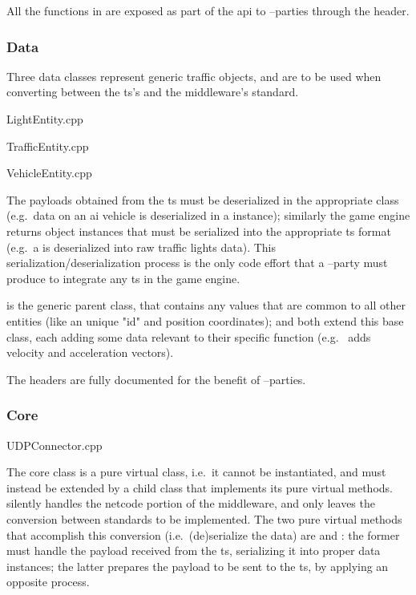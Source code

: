 All the functions in  are exposed as part of the \gls{api} to --parties through the  header.

\subsubsection{Data}

Three data classes represent generic traffic objects, and are to be used when converting between the \gls{ts}'s and the \gls{middleware}'s standard.

\begin{filelist}
	\item LightEntity.cpp
	\item TrafficEntity.cpp
	\item VehicleEntity.cpp
\end{filelist}

The \glspl{payload} obtained from the \gls{ts} must be deserialized in the appropriate class (e.g.\ data on an \gls{ai} vehicle is deserialized in a  instance); similarly the game engine returns object instances that must be serialized into the appropriate \gls{ts} format (e.g.\ a  is deserialized into raw traffic lights data). This serialization/deserialization process is the only code effort that a --party must produce to integrate any \gls{ts} in the game engine.

 is the generic parent class, that contains any values that are common to all other entities (like an unique "id" and position coordinates);  and  both extend this base class, each adding some data relevant to their specific function (e.g.\  adds velocity and acceleration vectors).

The headers are fully documented for the  benefit of --parties.

\subsubsection{Core}

\begin{filelist}
	\item UDPConnector.cpp
\end{filelist}

The core class is a  pure virtual class, i.e.\ it cannot be instantiated, and must instead be extended by a child class that implements its pure virtual methods.  silently handles the netcode portion of the \gls{middleware}, and only leaves the conversion between standards to be implemented. The two pure virtual methods that accomplish this conversion (i.e.\ (de)serialize the data) are  and : the former must handle the \gls{payload} received from the \gls{ts}, serializing it into proper data instances; the latter prepares the \gls{payload} to be sent to the \gls{ts}, by applying an opposite process.

